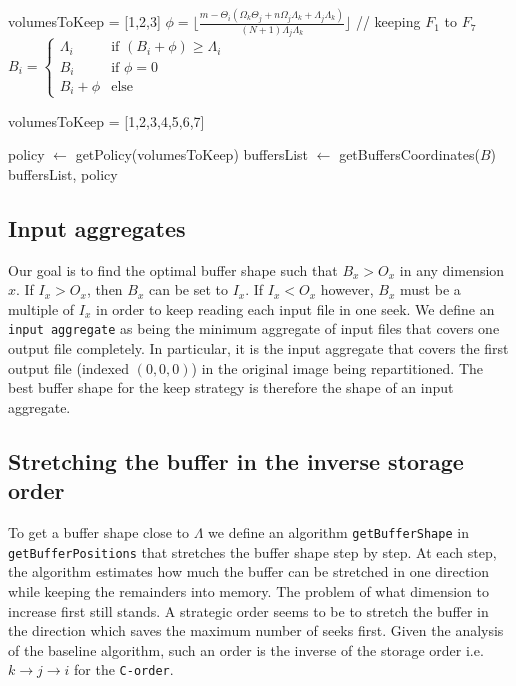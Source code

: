 \documentclass[conference]{IEEEtran}
\begin{document}
\begin{algorithm}
\begin{algorithmic}[1]
        \STATE volumesToKeep = [1,2,3]
      \ELSE
        \STATE $\phi = \lfloor \frac{m-\Theta_i(\Omega_k\Theta_j + n\Omega_j\Lambda_k + \Lambda_j\Lambda_k)}{(N+1)\Lambda_j\Lambda_k} \rfloor$ // keeping $F_1$ to $F_7$
        \STATE $B_i = \begin{cases}
          \Lambda_i & \textrm{if }(B_i+\phi) \geq \Lambda_i \\
          B_i & \textrm{if }\phi = 0 \\
          B_i+\phi & \textrm{else}
        \end{cases}$

        \STATE volumesToKeep = [1,2,3,4,5,6,7]
      \ENDIF
    \ENDIF
  \ENDIF

  \STATE policy $\leftarrow$ getPolicy(volumesToKeep)
  \STATE buffersList $\leftarrow$ getBuffersCoordinates($B$)
  \RETURN buffersList, policy
  \end{algorithmic}
\end{algorithm}

\subsection{Input aggregates}
Our goal is to find the optimal buffer shape such that $B_x>O_x$ in any dimension $x$.
If $I_x > O_x$, then $B_x$ can be set to $I_x$. If $I_x < O_x$ however, $B_x$
must be a multiple of $I_x$ in order to keep reading each input file in one seek.
We define an \texttt{input aggregate} as being the minimum aggregate of input files that
covers one output file completely. In particular, it is the input aggregate that
covers the first output file (indexed $(0,0,0)$) in the original image being
repartitioned. The best buffer shape for the keep strategy is therefore the shape of
an input aggregate.

\subsection{Stretching the buffer in the inverse storage order}
To get a buffer shape close to $\Lambda$ we define an algorithm
\texttt{getBufferShape} in \texttt{getBufferPositions} that stretches the
buffer shape step by step. At each step, the algorithm estimates how much the
buffer can be stretched in one direction while keeping the remainders into
memory. The problem of what dimension to increase first still stands. A
strategic order seems to be to stretch the buffer in the direction which saves
the maximum number of seeks first. Given the analysis of the baseline algorithm,
such an order is the inverse of the storage order i.e.
$k \rightarrow j \rightarrow i$ for the \texttt{C-order}.
\end{document}
